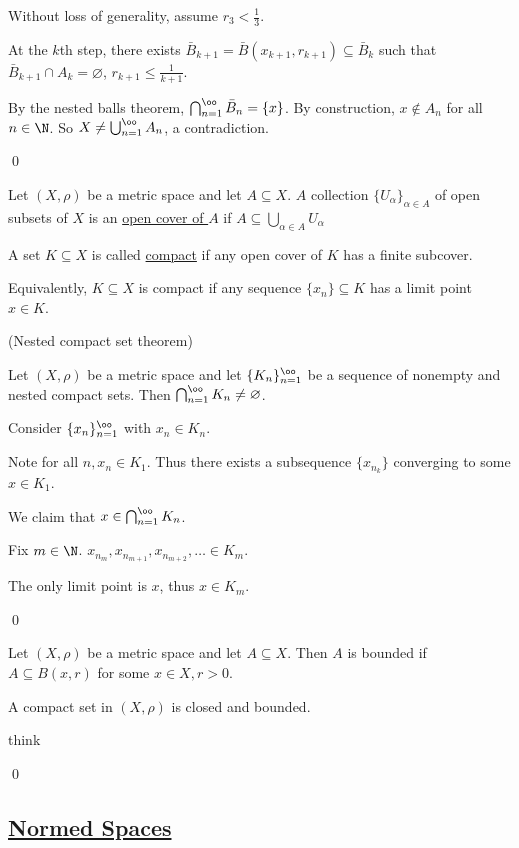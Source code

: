 \documentclass[x11names,reqno,14pt]{extarticle}
\newcommand{\seq}[2][\oo]{_{#2 = 1}^#1}
\newcommand{\bigcupn}[1][\oo]{\bigcup\seq[#1]{n}}
\newcommand{\bigcapn}[1][\oo]{\bigcap\seq[#1]{n}}
\begin{document}
Without loss of generality, assume $r_3 < \frac13$.

At the $k$th step, there exists $\bar{B}_{k + 1} = \bar{B}(x_{k + 1}, r_{k + 1}) \subseteq \bar{B}_k$ such that $\bar{B}_{k + 1}\cap A_k = \varnothing$, $r_{k + 1} \leq \frac{1}{k + 1}$. 

By the nested balls theorem, $\bigcapn \bar{B}_n = \{x\}$. By construction, $x\not\in A_n$ for all $n\in\N$. So $X \neq \bigcupn A_n$, a contradiction. 

\qed


Let $(X, \rho)$ be a metric space and let $A \subseteq X$. $A$ collection $\{U_\alpha\}_{\alpha \in A}$ of open subsets of $X$ is an \underline{open cover of $A$} if $A \subseteq \bigcup_{\alpha\in A}U_\alpha$

A set $K \subseteq X$ is called \underline{compact} if any open cover of $K$ has a finite subcover. 

Equivalently, $K \subseteq X$ is compact if any sequence $\{x_n\} \subseteq K$ has a limit point $x \in K$.

\thm (Nested compact set theorem)

Let $(X, \rho)$ be a metric space and let $\{K_n\}\seq{n}$ be a sequence of nonempty and nested compact sets. Then $\bigcapn K_n \neq\varnothing$. 

\proof

Consider $\{x_n\}\seq{n}$ with $x_n \in K_n$. 

Note for all $n, x_n \in K_1$. Thus there exists a subsequence $\{x_{n_k}\}$ converging to some $x \in K_1$. 

We claim that $x \in \bigcapn K_n$.  

Fix $m \in \N$. $x_{n_m}, x_{n_{m + 1}}, x_{n_{m + 2}}, \dots \in K_m$. 

The only limit point is $x$, thus $x \in K_m$. 

\qed


Let $(X, \rho)$ be a metric space and let $A \subseteq X$. Then $A$ is bounded if $A \subseteq B(x, r)$ for some $x \in X, r > 0$. 

\thm

A compact set in $(X, \rho)$ is closed and bounded. 

\proof

think

\qed

\subsection*{\underline{Normed Spaces}}
\end{document}
